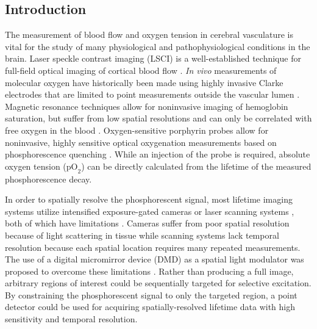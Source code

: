 \documentclass[12pt]{spieman}  %
\newcommand{\pO}{\ensuremath{\text{pO}_2}} 	            %
\begin{document}
\begin{spacing}{2}   %


\section{Introduction}
\label{sect:introduction}

The measurement of blood flow and oxygen tension in cerebral vasculature is vital for the study of many physiological and pathophysiological conditions in the brain. Laser speckle contrast imaging (LSCI) is a well-established technique for full-field optical imaging of cortical blood flow \cite{Briers:2001hy,Dunn:2001dj,Boas:2010vr,Dunn:2011gi}. \textit{In vivo} measurements of molecular oxygen have historically been made using highly invasive Clarke electrodes that are limited to point measurements outside the vascular lumen \cite{Vovenko:1999be,Tsai:2003cc,Roussakis:2015eu}. Magnetic resonance techniques allow for noninvasive imaging of hemoglobin saturation, but suffer from low spatial resolutions and can only be correlated with free oxygen in the blood \cite{Dunn:2003hg,Liu:2004fp,Hou:2003hb,Liu:2006bt,Roussakis:2015eu}. Oxygen-sensitive porphyrin probes allow for noninvasive, highly sensitive optical oxygenation measurements based on phosphorescence quenching \cite{Vinogradov:2012tda}. While an injection of the probe is required, absolute oxygen tension (\pO) can be directly calculated from the lifetime of the measured phosphorescence decay.

In order to spatially resolve the phosphorescent signal, most lifetime imaging systems utilize intensified exposure-gated cameras \cite{Shonat:2003ia,Sakadzic:2009jo} or laser scanning systems \cite{Yaseen:2009ep,Kazmi:2013ey}, both of which have limitations \cite{Devor:2014ke}. Cameras suffer from poor spatial resolution because of light scattering in tissue while scanning systems lack temporal resolution because each spatial location requires many repeated measurements. The use of a digital micromirror device (DMD) as a spatial light modulator was proposed to overcome these limitations \cite{Ponticorvo:2010uv}. Rather than producing a full image, arbitrary regions of interest could be sequentially targeted for selective excitation. By constraining the phosphorescent signal to only the targeted region, a point detector could be used for acquiring spatially-resolved lifetime data with high sensitivity and temporal resolution.


\end{spacing}
\end{document}
